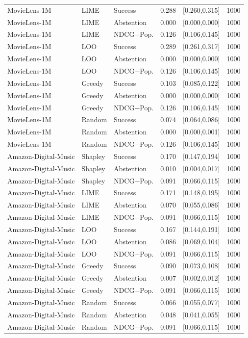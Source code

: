 \begin{table}[t]
\begin{tabular}{@{}lllrrr@{}}
MovieLens-1M & LIME & Success & 0.288 & [0.260,0.315] & 1000 \\
MovieLens-1M & LIME & Abstention & 0.000 & [0.000,0.000] & 1000 \\
MovieLens-1M & LIME & NDCG$-$Pop. & 0.126 & [0.106,0.145] & 1000 \\
MovieLens-1M & LOO & Success & 0.289 & [0.261,0.317] & 1000 \\
MovieLens-1M & LOO & Abstention & 0.000 & [0.000,0.000] & 1000 \\
MovieLens-1M & LOO & NDCG$-$Pop. & 0.126 & [0.106,0.145] & 1000 \\
MovieLens-1M & Greedy & Success & 0.103 & [0.085,0.122] & 1000 \\
MovieLens-1M & Greedy & Abstention & 0.000 & [0.000,0.000] & 1000 \\
MovieLens-1M & Greedy & NDCG$-$Pop. & 0.126 & [0.106,0.145] & 1000 \\
MovieLens-1M & Random & Success & 0.074 & [0.064,0.086] & 1000 \\
MovieLens-1M & Random & Abstention & 0.000 & [0.000,0.001] & 1000 \\
MovieLens-1M & Random & NDCG$-$Pop. & 0.126 & [0.106,0.145] & 1000 \\
Amazon-Digital-Music & Shapley & Success & 0.170 & [0.147,0.194] & 1000 \\
Amazon-Digital-Music & Shapley & Abstention & 0.010 & [0.004,0.017] & 1000 \\
Amazon-Digital-Music & Shapley & NDCG$-$Pop. & 0.091 & [0.066,0.115] & 1000 \\
Amazon-Digital-Music & LIME & Success & 0.171 & [0.148,0.195] & 1000 \\
Amazon-Digital-Music & LIME & Abstention & 0.070 & [0.055,0.086] & 1000 \\
Amazon-Digital-Music & LIME & NDCG$-$Pop. & 0.091 & [0.066,0.115] & 1000 \\
Amazon-Digital-Music & LOO & Success & 0.167 & [0.144,0.191] & 1000 \\
Amazon-Digital-Music & LOO & Abstention & 0.086 & [0.069,0.104] & 1000 \\
Amazon-Digital-Music & LOO & NDCG$-$Pop. & 0.091 & [0.066,0.115] & 1000 \\
Amazon-Digital-Music & Greedy & Success & 0.090 & [0.073,0.108] & 1000 \\
Amazon-Digital-Music & Greedy & Abstention & 0.007 & [0.002,0.012] & 1000 \\
Amazon-Digital-Music & Greedy & NDCG$-$Pop. & 0.091 & [0.066,0.115] & 1000 \\
Amazon-Digital-Music & Random & Success & 0.066 & [0.055,0.077] & 1000 \\
Amazon-Digital-Music & Random & Abstention & 0.048 & [0.041,0.055] & 1000 \\
Amazon-Digital-Music & Random & NDCG$-$Pop. & 0.091 & [0.066,0.115] & 1000 \\
\bottomrule
\end{tabular}
\end{table}

